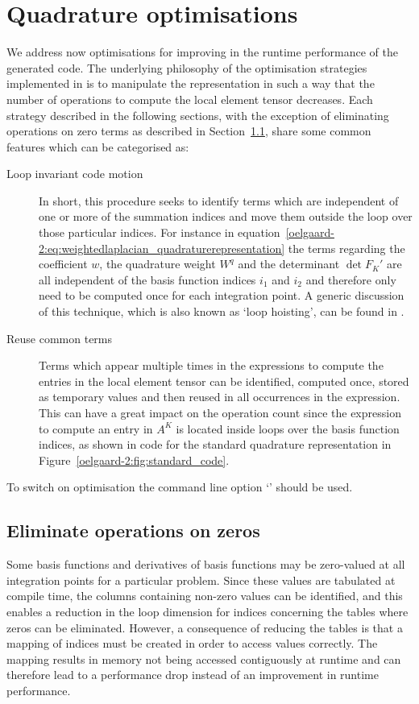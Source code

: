 \section{Quadrature optimisations}
\label{oelgaard-2:sec:quadrature_optimisations}
%
We address now optimisations for improving in the runtime performance of the
generated code.
The underlying philosophy of the optimisation strategies implemented in
\ffc{} is to manipulate the representation in such a way that the number of
operations to compute the local element tensor decreases.
Each strategy described in the following sections, with the exception
of eliminating operations on zero terms as described in
Section~\ref{oelgaard-2:sec:eliminate_zeros},
share some common features which can be categorised as:
%
\begin{description}
  \item[Loop invariant code motion] In short, this procedure seeks to identify
  terms which are independent of one or more of the summation indices and move
  them outside the loop over those particular indices.
  For instance in
  equation~\eqref{oelgaard-2:eq:weightedlaplacian_quadraturerepresentation}
  the terms regarding the coefficient $w$, the quadrature weight $W^q$ and the
  determinant $\det F_K'$ are all independent of the basis function indices
  $i_1$ and $i_2$ and therefore only need to be computed once for each
  integration point.
  A generic discussion of this technique, which is also known as `loop hoisting',
  can be found in \citet{AhoSethiUllman1986}.
%
  \item[Reuse common terms] Terms which appear multiple times in the expressions
  to compute the entries in the local element tensor can
  be identified, computed once, stored as temporary values and then reused in
  all occurrences in the expression.
  This can have a great impact on the operation count since the expression to
  compute an entry in $A^K$ is located inside loops over the basis function
  indices, as shown in code for the standard quadrature representation in
  Figure~\ref{oelgaard-2:fig:standard_code}.
%
\end{description}
%
To switch on optimisation the command line option `' should be used.
%
\subsection{Eliminate operations on zeros}
\label{oelgaard-2:sec:eliminate_zeros}
%
Some basis functions and derivatives of basis functions may be zero-valued
at all integration points for a particular problem.
Since these values are tabulated at compile time, the columns containing
non-zero values can be identified, and this enables a reduction in the loop
dimension for indices concerning the tables where zeros can be eliminated.
However, a consequence of reducing the tables is that a mapping of indices
must be created in order to access values correctly.
The mapping results in memory not being accessed contiguously at runtime and
can therefore lead to a performance drop instead of an improvement
in runtime performance.


